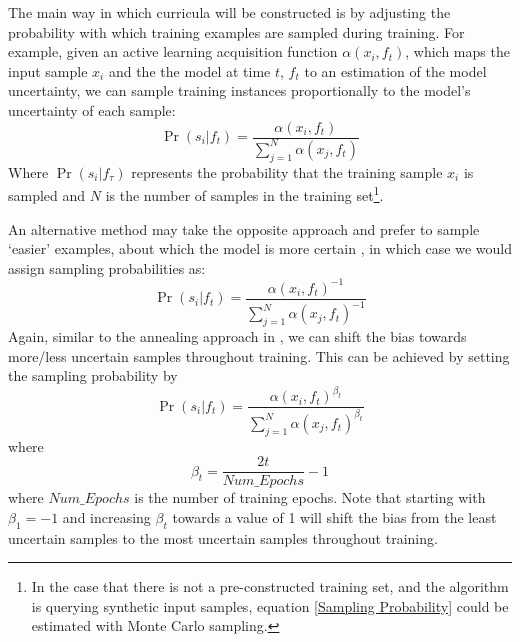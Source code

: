 \documentclass[a4paper,10pt]{article}
\begin{document}
The main way in which curricula will be constructed is by adjusting the probability with which training examples are sampled during training. For example, given an active learning acquisition function $\alpha(x_i,f_t)$, which maps the input sample $x_i$ and the the model at time $t$, $f_t$ to an estimation of the model uncertainty, we can sample training instances proportionally to the model's uncertainty of each sample:
\begin{equation}\label{Sampling Probability}
\Pr(s_i|f_t) = \frac{\alpha(x_i,f_t)}{\sum_{j=1}^{N}\alpha(x_j,f_t)}
\end{equation}
Where $\Pr(s_i|f_\tau)$ represents the probability that the training sample $x_i$ is sampled and $N$ is the number of samples in the training set\footnote{In the case that there is not a pre-constructed training set, and the algorithm is querying synthetic input samples, equation \ref{Sampling Probability} could be estimated with Monte Carlo sampling.}. 

An alternative method may take the opposite approach and prefer to sample `easier' examples, about which the model is more certain , in which case we would assign sampling probabilities as:
\begin{equation}
\Pr(s_i|f_t) = \frac{\alpha(x_i,f_t)^{-1}}{\sum_{j=1}^{N}\alpha(x_j,f_t)^{-1}}
\end{equation}
Again, similar to the annealing approach in \cite{Koller 2010}, we can shift the bias towards more/less uncertain samples throughout training. This can be achieved by setting the sampling probability by
\begin{equation}
\Pr(s_i|f_t) = \frac{\alpha(x_i,f_t)^{\beta_t}}{\sum_{j=1}^{N}\alpha(x_j,f_t)^{\beta_t}}
\end{equation}
where
\begin{equation}
\beta_t = \frac{2t}{Num\_Epochs} - 1
\end{equation}
where $Num\_Epochs$ is the number of training epochs. Note that starting with $\beta_1 = -1$ and increasing $\beta_t$ towards a value of 1 will shift the bias from the least uncertain samples to the most uncertain samples throughout training.
\end{document}
